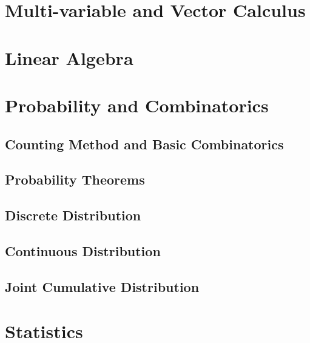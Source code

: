 \documentclass[
	12pt, %
	fleqn, %
	a4paper, %
]{LegrandOrangeBook}
\begin{document}
\part{Multi-variable and Vector Calculus}

\part{Linear Algebra}
\part{Probability and Combinatorics}

\chapterspaceabove{6.75cm} 
\chapterspacebelow{7.25cm} 
\chapter{Counting Method and Basic Combinatorics}


\chapterspaceabove{6.75cm} 
\chapterspacebelow{7.25cm} 
\chapter{Probability Theorems}


\chapterspaceabove{6.75cm} 
\chapterspacebelow{7.25cm} 
\chapter{Discrete Distribution}


\chapterspaceabove{6.75cm} 
\chapterspacebelow{7.25cm} 
\chapter{Continuous Distribution}


\chapterspaceabove{6.75cm} 
\chapterspacebelow{7.25cm} 
\chapter{Joint Cumulative Distribution}
\part{Statistics}



\stopcontents[part] %
\end{document}
